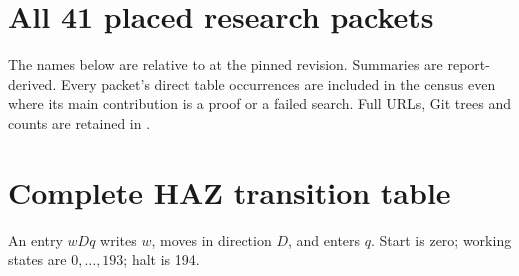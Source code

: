 \documentclass[11pt]{article}
\begin{document}
\section{All 41 placed research packets}\label{app:ledger}
The names below are relative to
 at the pinned revision.
Summaries are report-derived. Every packet's direct table occurrences are
included in the census even where its main contribution is a proof or a
failed search. Full URLs, Git trees and counts are retained in
.


\section{Complete HAZ transition table}\label{app:table}
An entry $wDq$ writes $w$, moves in direction $D$, and enters $q$.
Start is zero; working states are $0,\ldots,193$; halt is 194.
{\small}
\end{document}

